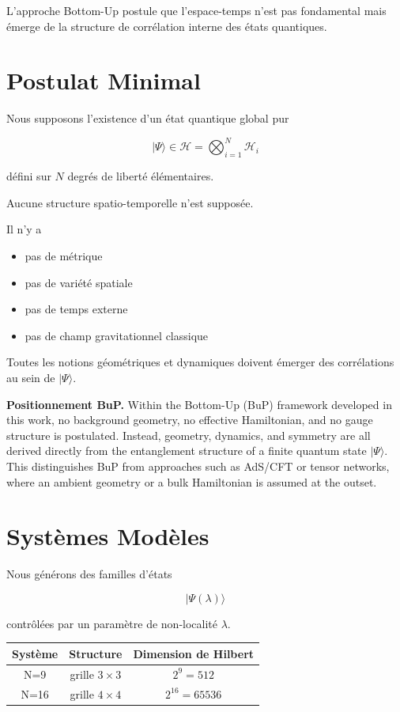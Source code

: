 \documentclass[11pt]{article}
\begin{document}
L'approche Bottom-Up postule que l'espace-temps n'est pas fondamental mais émerge de la structure de corrélation interne des états quantiques.

\section{Postulat Minimal}

Nous supposons l'existence d'un état quantique global pur

\[
|\Psi\rangle \in \mathcal{H} = \bigotimes_{i=1}^{N} \mathcal{H}_i
\]

défini sur $N$ degrés de liberté élémentaires.

Aucune structure spatio-temporelle n'est supposée.

Il n'y a

\begin{itemize}
\item pas de métrique
\item pas de variété spatiale
\item pas de temps externe
\item pas de champ gravitationnel classique
\end{itemize}

Toutes les notions géométriques et dynamiques doivent émerger des corrélations au sein de $|\Psi\rangle$.

\medskip
\noindent\textbf{Positionnement BuP.}
Within the Bottom-Up (BuP) framework developed in this work, no background geometry, no effective Hamiltonian, and no gauge structure is postulated. Instead, geometry, dynamics, and symmetry are all derived directly from the entanglement structure of a finite quantum state $|\Psi\rangle$. This distinguishes BuP from approaches such as AdS/CFT or tensor networks, where an ambient geometry or a bulk Hamiltonian is assumed at the outset.

\section{Systèmes Modèles}

Nous générons des familles d'états

\[
|\Psi(\lambda)\rangle
\]

contrôlées par un paramètre de non-localité $\lambda$.

\begin{center}
\begin{tabular}{ccc}
\toprule
Système & Structure & Dimension de Hilbert \\
\midrule
N=9 & grille $3\times3$ & $2^9=512$ \\
N=16 & grille $4\times4$ & $2^{16}=65536$ \\
\bottomrule
\end{tabular}
\end{center}
\end{document}
